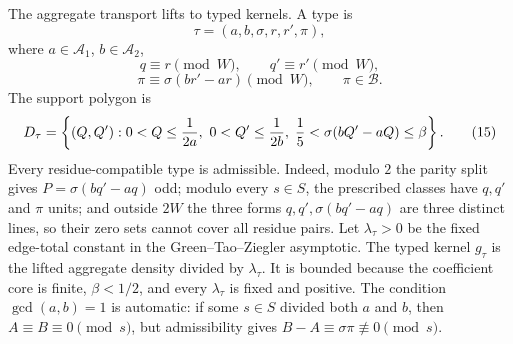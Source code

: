 \documentclass[11pt]{article}
\newcommand{\B}{\mathcal B}
\begin{document}
The aggregate transport lifts to typed kernels.  A type is
\[
  \tau=(a,b,\sigma,r,r',\pi),
\]
where $a\in\mathcal A_1$, $b\in\mathcal A_2$,
\[
  q\equiv r\pmod W,
  \qquad q'\equiv r'\pmod W,
\]
\[
  \pi\equiv\sigma(br'-ar)\pmod W,
  \qquad \pi\in\B.
\]
The support polygon is
\[
  D_\tau=\left\{(Q,Q'):
  0<Q\le{1\over2a},\ 0<Q'\le{1\over2b},\;
  {1\over5}<\sigma(bQ'-aQ)\le\beta\right\}.              \tag{15}
\]
Every residue-compatible type is admissible.  Indeed, modulo $2$ the parity
split gives $P=\sigma(bq'-aq)$ odd; modulo every $s\in S$, the prescribed
classes have $q,q'$ and $\pi$ units; and outside $2W$ the three forms
$q,q',\sigma(bq'-aq)$ are three distinct lines, so their zero sets cannot cover
all residue pairs.  Let $\lambda_\tau>0$ be the fixed edge-total constant in the
Green--Tao--Ziegler asymptotic.  The typed kernel $g_\tau$ is the lifted
aggregate density divided by $\lambda_\tau$.  It is bounded because the
coefficient core is finite, $\beta<1/2$, and every $\lambda_\tau$ is fixed and
positive.  The condition $\gcd(a,b)=1$ is automatic:
if some $s\in S$ divided both $a$ and $b$, then $A\equiv B\equiv0\pmod s$, but
admissibility gives $B-A\equiv\sigma\pi\not\equiv0\pmod s$.
\end{document}
